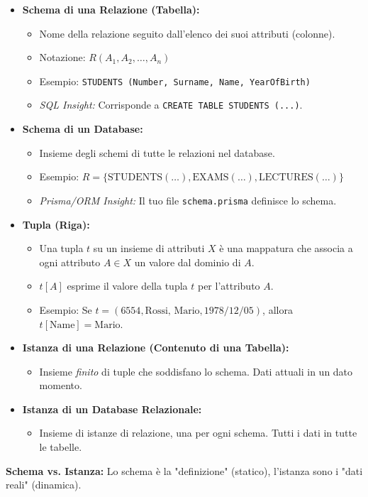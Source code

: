 \begin{itemize}
	\item \textbf{Schema di una Relazione (Tabella):}
	\begin{itemize}
		\item Nome della relazione seguito dall'elenco dei suoi attributi (colonne).
		\item Notazione: $R(A_1, A_2, \dots, A_n)$
		\item Esempio: \texttt{STUDENTS (Number, Surname, Name, YearOfBirth)}
		\item \textit{SQL Insight:} Corrisponde a \texttt{CREATE TABLE STUDENTS (...)}.
	\end{itemize}
	\item \textbf{Schema di un Database:}
	\begin{itemize}
		\item Insieme degli schemi di tutte le relazioni nel database.
		\item Esempio: $R = \{\text{STUDENTS}(\dots), \text{EXAMS}(\dots), \text{LECTURES}(\dots)\}$
		\item \textit{Prisma/ORM Insight:} Il tuo file \texttt{schema.prisma} definisce lo schema.
	\end{itemize}
	\item \textbf{Tupla (Riga):}
	\begin{itemize}
		\item Una tupla $t$ su un insieme di attributi $X$ è una mappatura che associa a ogni attributo $A \in X$ un valore dal dominio di $A$.
		\item $t[A]$ esprime il valore della tupla $t$ per l'attributo $A$.
		\item Esempio: Se $t = (6554, \text{Rossi, Mario}, 1978/12/05)$, allora $t[\text{Name}] = \text{Mario}$.
	\end{itemize}
	\item \textbf{Istanza di una Relazione (Contenuto di una Tabella):}
	\begin{itemize}
		\item Insieme \textit{finito} di tuple che soddisfano lo schema. Dati attuali in un dato momento.
	\end{itemize}
	\item \textbf{Istanza di un Database Relazionale:}
	\begin{itemize}
		\item Insieme di istanze di relazione, una per ogni schema. Tutti i dati in tutte le tabelle.
	\end{itemize}
\end{itemize}
\textbf{Schema vs. Istanza:} Lo schema è la "definizione" (statico), l'istanza sono i "dati reali" (dinamica).

